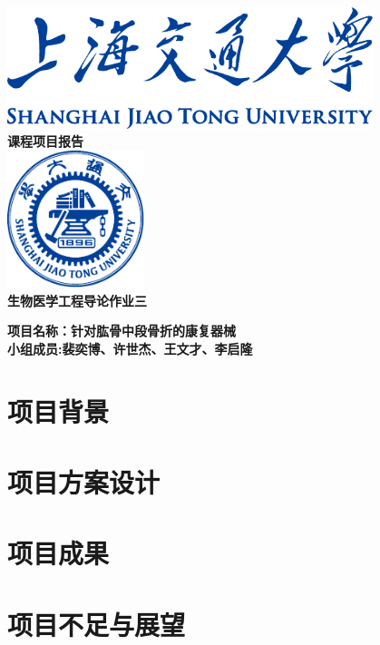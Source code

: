 \documentclass[UTF8]{ctexart}
\begin{document}
\begin{titlepage}
    \begin{center}
        \includegraphics[width=0.8\textwidth]{sjtu-name-blue.pdf}\\[1cm]
        \textsc{\huge \bfseries 课程项目报告}\\[1.5cm]
        \includegraphics[width=0.3\textwidth]{sjtu-badge-blue.pdf}\\[1cm]    
        \textsc{\huge \bfseries 生物医学工程导论作业三}\\[1.5cm]

        \begin{minipage}{0.7\textwidth}
            \begin{flushleft} 
                \LARGE \bfseries{项目名称：针对肱骨中段骨折的康复器械}
                \\
                \LARGE \bfseries{小组成员:裴奕博、许世杰、王文才、李启隆}
            \end{flushleft}
        \end{minipage}

    \end{center}
\end{titlepage}

\begin{abstract}
\end{abstract}
\newpage



\section{项目背景}
\newpage
    
\section{项目方案设计}
\newpage


\section{项目成果}
\newpage

\section{项目不足与展望}
\newpage
    

    
\end{document}
